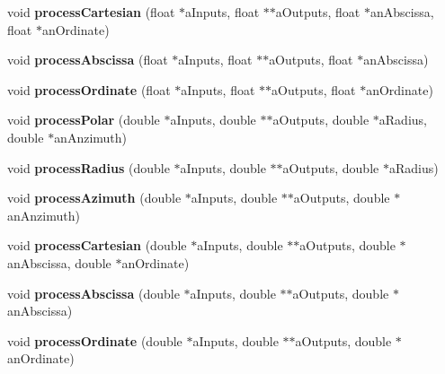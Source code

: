 \begin{DoxyCompactItemize}
\item 
\hypertarget{class_ambisonic_map_a67b14d2943266ce16f5f5fc8e6da1c68}{void {\bfseries process\-Cartesian} (float $\ast$a\-Inputs, float $\ast$$\ast$a\-Outputs, float $\ast$an\-Abscissa, float $\ast$an\-Ordinate)}\label{class_ambisonic_map_a67b14d2943266ce16f5f5fc8e6da1c68}

\item 
\hypertarget{class_ambisonic_map_a34452565af2418a3928e1ddb171fd4af}{void {\bfseries process\-Abscissa} (float $\ast$a\-Inputs, float $\ast$$\ast$a\-Outputs, float $\ast$an\-Abscissa)}\label{class_ambisonic_map_a34452565af2418a3928e1ddb171fd4af}

\item 
\hypertarget{class_ambisonic_map_a8ebd185ed813b52d5abd1064e672bec3}{void {\bfseries process\-Ordinate} (float $\ast$a\-Inputs, float $\ast$$\ast$a\-Outputs, float $\ast$an\-Ordinate)}\label{class_ambisonic_map_a8ebd185ed813b52d5abd1064e672bec3}

\item 
\hypertarget{class_ambisonic_map_ad9f96367e92bbe1422becc8d311090f3}{void {\bfseries process\-Polar} (double $\ast$a\-Inputs, double $\ast$$\ast$a\-Outputs, double $\ast$a\-Radius, double $\ast$an\-Anzimuth)}\label{class_ambisonic_map_ad9f96367e92bbe1422becc8d311090f3}

\item 
\hypertarget{class_ambisonic_map_a0023e3e6d4a2e162de5ae646e0671453}{void {\bfseries process\-Radius} (double $\ast$a\-Inputs, double $\ast$$\ast$a\-Outputs, double $\ast$a\-Radius)}\label{class_ambisonic_map_a0023e3e6d4a2e162de5ae646e0671453}

\item 
\hypertarget{class_ambisonic_map_a692d7484672252d0d16273eaeab198ad}{void {\bfseries process\-Azimuth} (double $\ast$a\-Inputs, double $\ast$$\ast$a\-Outputs, double $\ast$an\-Anzimuth)}\label{class_ambisonic_map_a692d7484672252d0d16273eaeab198ad}

\item 
\hypertarget{class_ambisonic_map_a92e083331525ea4906b2691fd6725991}{void {\bfseries process\-Cartesian} (double $\ast$a\-Inputs, double $\ast$$\ast$a\-Outputs, double $\ast$an\-Abscissa, double $\ast$an\-Ordinate)}\label{class_ambisonic_map_a92e083331525ea4906b2691fd6725991}

\item 
\hypertarget{class_ambisonic_map_a615f5aeab5cd0b90920c7c4187b9600f}{void {\bfseries process\-Abscissa} (double $\ast$a\-Inputs, double $\ast$$\ast$a\-Outputs, double $\ast$an\-Abscissa)}\label{class_ambisonic_map_a615f5aeab5cd0b90920c7c4187b9600f}

\item 
\hypertarget{class_ambisonic_map_a2d1acd86706d4b3e6750a44c28f946da}{void {\bfseries process\-Ordinate} (double $\ast$a\-Inputs, double $\ast$$\ast$a\-Outputs, double $\ast$an\-Ordinate)}\label{class_ambisonic_map_a2d1acd86706d4b3e6750a44c28f946da}

\end{DoxyCompactItemize}
